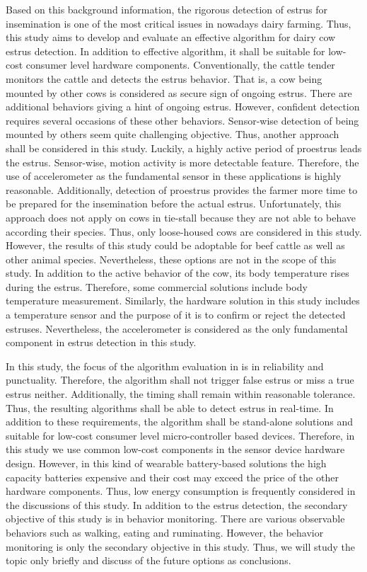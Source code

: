 \documentclass[english,12pt,a4paper,pdftex,elec,utf8]{aaltothesis}
\begin{document}
Based on this background information, the rigorous detection of estrus for insemination is one of the most critical issues in nowadays dairy farming. Thus, this study aims to develop and evaluate an effective algorithm for dairy cow estrus detection. In addition to effective algorithm, it shall be suitable for low-cost consumer level hardware components. Conventionally, the cattle tender monitors the cattle and detects the estrus behavior. That is, a cow being mounted by other cows is considered as secure sign of ongoing estrus. There are additional behaviors giving a hint of ongoing estrus. However, confident detection requires several occasions of these other behaviors. Sensor-wise detection of being mounted by others seem quite challenging objective. Thus, another approach shall be considered in this study. Luckily, a highly active period of proestrus leads the estrus. Sensor-wise, motion activity is more detectable feature. Therefore, the use of accelerometer as the fundamental sensor in these applications is highly reasonable. Additionally, detection of proestrus provides the farmer more time to be prepared for the insemination before the actual estrus. Unfortunately, this approach does not apply on cows in tie-stall because they are not able to behave according their species. Thus, only loose-housed cows are considered in this study. However, the results of this study could be adoptable for beef cattle as well as other animal species. Nevertheless, these options are not in the scope of this study. In addition to the active behavior of the cow, its body temperature rises during the estrus. Therefore, some commercial solutions include body temperature measurement. Similarly, the hardware solution in this study includes a temperature sensor and the purpose of it is to confirm or reject the detected estruses. Nevertheless, the accelerometer is considered as the only fundamental component in estrus detection in this study.

In this study, the focus of the algorithm evaluation in is in reliability and punctuality. Therefore, the algorithm shall not trigger false estrus or miss a true estrus neither. Additionally, the timing shall remain within reasonable tolerance.  Thus, the resulting algorithms shall be able to detect estrus in real-time. In addition to these requirements, the algorithm shall be stand-alone solutions and suitable for low-cost consumer level micro-controller based devices. Therefore, in this study we use common low-cost components in the sensor device hardware design. However, in this kind of wearable battery-based solutions the high capacity batteries expensive and their cost may exceed the price of the other hardware components. Thus, low energy consumption is frequently considered in the discussions of this study. In addition to the estrus detection, the secondary objective of this study is in behavior monitoring. There are various observable behaviors such as walking, eating and ruminating. However, the behavior monitoring is only the secondary objective in this study. Thus, we will study the topic only briefly and discuss of the future options as conclusions.
\end{document}
